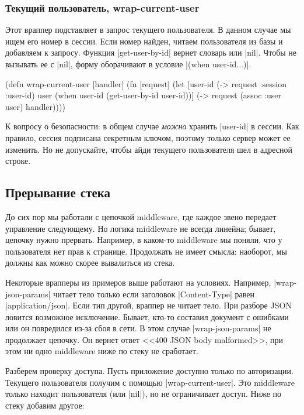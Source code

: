 \subsubsection*{Текущий пользователь, wrap-current-user}

Этот враппер подставляет в запрос текущего пользователя. В данном случае мы ищем
его номер в сессии. Если номер найден, читаем пользователя из базы и добавляем к
запросу. Функция \spverb|get-user-by-id| вернет словарь или \spverb|nil|. Чтобы
не вызывать ее с \spverb|nil|, форму оборачивают в условие
\spverb|(when user-id...)|.

\begin{english}
  \begin{clojure}
(defn wrap-current-user [handler]
  (fn [request]
    (let [user-id (-> request :session :user-id)
          user (when user-id
                 (get-user-by-id user-id))]
      (-> request
          (assoc :user user)
          handler))))
  \end{clojure}
\end{english}

К вопросу о безопасности: в общем случае \emph{можно} хранить \spverb|user-id| в
сессии. Как правило, сессия подписана секретным ключом, поэтому только сервер
может ее изменить. Но не допускайте, чтобы айди текущего пользователя шел в
адресной строке.

\subsection{Прерывание стека}

До сих пор мы работали с цепочкой middleware, где каждое звено передает
управление следующему. Но логика middleware не всегда линейна; бывает, цепочку
нужно прервать. Например, в каком-то middleware мы поняли, что у пользователя
нет прав к странице. Продолжать не имеет смысла: наоборот, мы должны как можно
скорее вывалиться из стека.

Некоторые врапперы из примеров выше работают на условиях. Например,
\spverb|wrap-json-params| читает тело только если заголовок
\spverb|Content-Type| равен \spverb|application/json|. Если тип другой, враппер
не читает тело. При разборе JSON ловится возможное исключение. Бывает, кто-то
составил документ с ошибками или он повредился из-за сбоя в сети. В этом случае
\spverb|wrap-json-params| не продолжает цепочку. Он вернет ответ <<400 JSON body
malformed>>, при этом ни одно middleware ниже по стеку не сработает.

Разберем проверку доступа. Пусть приложение доступно только по
авторизации. Текущего пользователя получим с помощью
\spverb|wrap-current-user|. Это middleware только находит пользователя (или
\spverb|nil|), но не ограничивает доступ. Ниже по стеку добавим другое:


